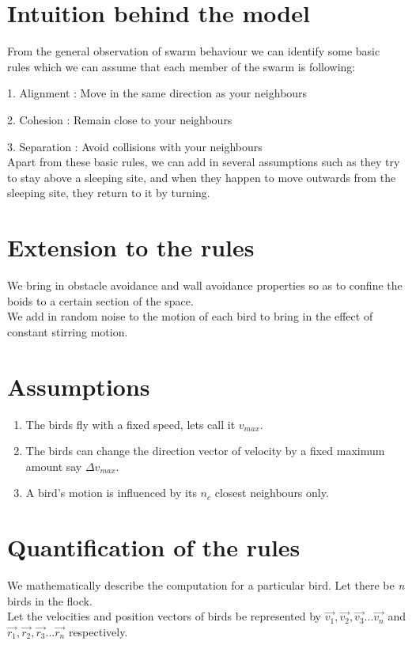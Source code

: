 \documentclass[a4paper,12pt,openany]{book}
\begin{document}
\section{Intuition behind the model}
From the general observation of swarm behaviour we can identify some basic rules which we can assume that each member of the swarm is following:

1. Alignment : Move in the same direction as your neighbours

2. Cohesion : Remain close to your neighbours

3. Separation : Avoid collisions with your neighbours
\\
Apart from these basic rules, we can add in several assumptions such as they try to stay above a sleeping site, and when they happen to move outwards from the sleeping site, they return to it by turning. 


\section{Extension to the rules}
We bring in obstacle avoidance and wall avoidance properties so as to confine the boids to a certain section of the space.
\\
We add in random noise to the motion of each bird to bring in the effect of constant stirring motion.

\section{Assumptions}
\begin{enumerate}
	\item The birds fly with a fixed speed, lets call it $v_{max}$.
	\item The birds can change the direction vector of velocity by a fixed maximum amount say $\Delta v_{max}$.
	\item A bird's motion is influenced by its $n_{c}$ closest neighbours only.
	
\end{enumerate}

\section{Quantification of the rules}
We mathematically describe the computation for a particular bird. Let there be \emph{n} birds in the flock.\\
Let the velocities and position vectors of birds be represented by $\vec{v_1},\vec{v_2},\vec{v_3} ... \vec{v_n}$ and $\vec{r_1},\vec{r_2},\vec{r_3} ... \vec{r_n}$ respectively. \\
\end{document}
